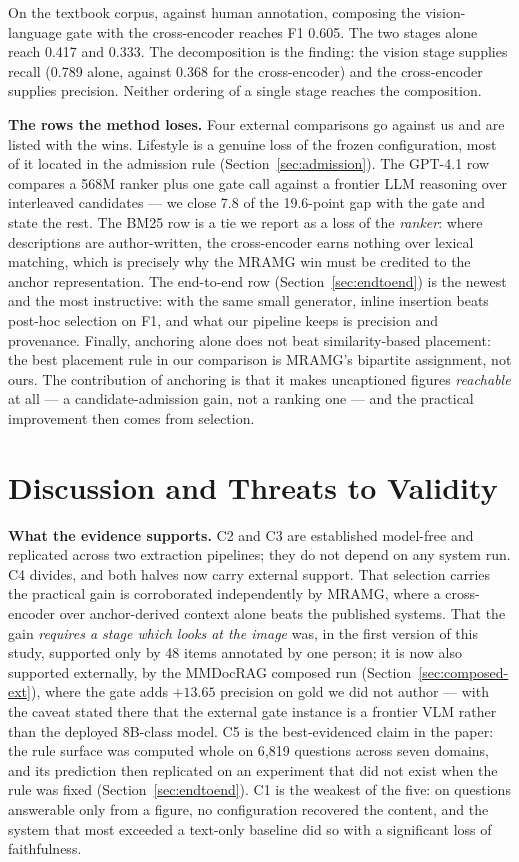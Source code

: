 \documentclass[journal]{IEEEtran}
\begin{document}
On the textbook corpus, against human annotation, composing the vision-language
gate with the cross-encoder reaches F1 0.605. The two stages alone reach 0.417 and
0.333. The decomposition is the finding: the vision stage supplies recall
(0.789 alone, against 0.368 for the cross-encoder) and the cross-encoder supplies
precision. Neither ordering of a single stage reaches the composition.

\textbf{The rows the method loses.} Four external comparisons go against us and
are listed with the wins. Lifestyle is a genuine loss of the frozen
configuration, most of it located in the admission rule
(Section~\ref{sec:admission}). The GPT-4.1 row compares a 568M ranker plus one
gate call against a frontier LLM reasoning over interleaved candidates --- we
close 7.8 of the 19.6-point gap with the gate and state the rest. The BM25 row
is a tie we report as a loss of the \emph{ranker}: where descriptions are
author-written, the cross-encoder earns nothing over lexical matching, which is
precisely why the MRAMG win must be credited to the anchor representation. The
end-to-end row (Section~\ref{sec:endtoend}) is the newest and the most
instructive: with the same small generator, inline insertion beats post-hoc
selection on F1, and what our pipeline keeps is precision and provenance.
Finally, anchoring alone does not beat similarity-based
placement: the best placement rule in our comparison is MRAMG's bipartite
assignment, not ours. The contribution of anchoring is that it makes uncaptioned
figures \emph{reachable} at all --- a candidate-admission gain, not a ranking one
--- and the practical improvement then comes from selection.

\section{Discussion and Threats to Validity}
\label{sec:threats}

\textbf{What the evidence supports.} C2 and C3 are established model-free and
replicated across two extraction pipelines; they do not depend on any system run.
C4 divides, and both halves now carry external support. That selection carries the
practical gain is corroborated independently by MRAMG, where a cross-encoder over
anchor-derived context alone beats the published systems. That the gain
\emph{requires a stage which looks at the image} was, in the first version of
this study, supported only by 48 items annotated by one person; it is now also
supported externally, by the MMDocRAG composed run
(Section~\ref{sec:composed-ext}), where the gate adds $+13.65$ precision on gold
we did not author --- with the caveat stated there that the external gate
instance is a frontier VLM rather than the deployed 8B-class model. C5 is the
best-evidenced claim in the paper: the rule surface was computed whole on
6{,}819 questions across seven domains, and its prediction then replicated on
an experiment that did not exist when the rule was fixed
(Section~\ref{sec:endtoend}). C1 is the weakest of the five: on questions answerable only from a figure,
no configuration recovered the content, and the system that most exceeded a
text-only baseline did so with a significant loss of faithfulness.
\end{document}

